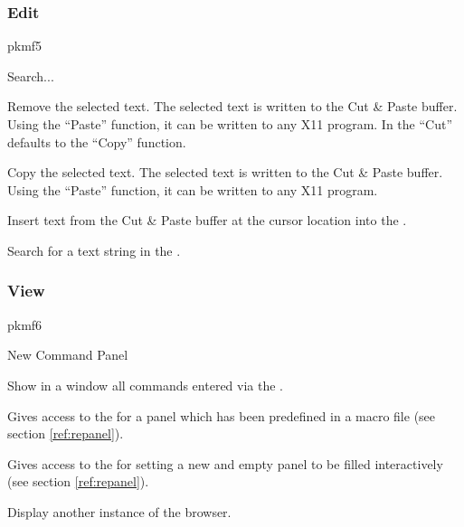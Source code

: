 \subsubsection*{Edit}
\begin{PICTf}{pkmf5}
\begin{DLsf}{Search...}
\item[Cut]
         Remove the selected text. The selected text is written to the
         Cut \& Paste buffer. Using the ``Paste'' function, it can be
         written to any X11 program. In the \TP{} ``Cut''
         defaults to the ``Copy'' function.
\item[Copy]
         Copy the selected text. The selected text is written to the
         Cut \& Paste buffer. Using the ``Paste'' function, it can be
         written to any X11 program.
\item[Paste]
         Insert text from the Cut \& Paste buffer at the cursor location
         into the \INP{}.
\item[Search...]
         Search for a text string in the \TP{}.
\end{DLsf}
\end{PICTf}

\subsubsection*{View}
\label{ref:repkmf6}
\begin{PICTf}{pkmf6}
\begin{DLsf}{New Command Panel}
\item[Show Input]
         Show in a window all commands entered via the \INP{}.
\item[Command Panel]
         Gives access to the \PNI{}
         for a panel which has been predefined in a macro file 
         (see section \ref{ref:repanel}).
\item[New Command Panel]
         Gives access to the \PNI{}
         for setting a new and empty panel to be filled interactively
         (see section \ref{ref:repanel}).
\item[Browser]
          Display another instance of the browser.
\end{DLsf}
\end{PICTf}

